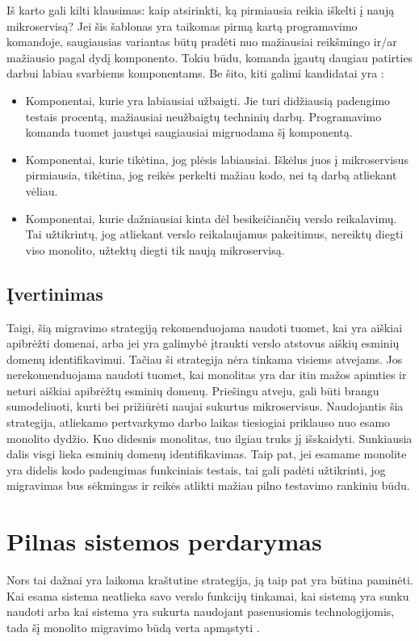 \documentclass{VUMIFPSbakalaurinis}
\begin{document}
Iš karto gali kilti klausimas: kaip atsirinkti, ką pirmiausia reikia iškelti į naują mikroservisą? Jei šis šablonas yra taikomas pirmą kartą programavimo komandoje, saugiausias variantas būtų pradėti nuo mažiausiai reikšmingo ir/ar mažiausio pagal dydį komponento. Tokiu būdu, komanda įgautų daugiau patirties darbui labiau svarbiems komponentams. Be šito, kiti galimi kandidatai yra \cite{Beh18}:
\begin{itemize}
    \item Komponentai, kurie yra labiausiai užbaigti. Jie turi didžiausią padengimo testais procentą, mažiausiai neužbaigtų techninių darbų. Programavimo komanda tuomet jaustųsi saugiausiai migruodama šį komponentą.
    
    \item Komponentai, kurie tikėtina, jog plėsis labiausiai. Iškėlus juos į mikroservisus pirmiausia, tikėtina, jog reikės perkelti mažiau kodo, nei tą darbą atliekant vėliau.
    
    \item Komponentai, kurie dažniausiai kinta dėl besikeičiančių verslo reikalavimų. Tai užtikrintų, jog atliekant verslo reikalaujamus pakeitimus, nereiktų diegti viso monolito, užtektų diegti tik naują mikroservisą.\\
\end{itemize}

\subsection{Įvertinimas}
Taigi, šią migravimo strategiją rekomenduojama naudoti tuomet, kai yra aiškiai apibrėžti domenai, arba jei yra galimybė įtraukti verslo atstovus aiškių esminių domenų identifikavimui. Tačiau ši strategija nėra tinkama visiems atvejams. Jos nerekomenduojama naudoti tuomet, kai monolitas yra dar itin mažos apimties ir neturi aiškiai apibrėžtų esminių domenų. Priešingu atveju, gali būti brangu sumodeliuoti, kurti bei prižiūrėti naujai sukurtus mikroservisus. Naudojantis šia strategija, atliekamo pertvarkymo darbo laikas tiesiogiai priklauso nuo esamo monolito dydžio. Kuo didesnis monolitas, tuo ilgiau truks jį išskaidyti. Sunkiausia dalis visgi lieka esminių domenų identifikavimas. Taip pat, jei esamame monolite yra didelis kodo padengimas funkciniais testais, tai gali padėti užtikrinti, jog migravimas bus sėkmingas ir reikės atlikti mažiau pilno testavimo rankiniu būdu.

\section{Pilnas sistemos perdarymas}
Nors tai dažnai yra laikoma kraštutine strategija, ją taip pat yra būtina paminėti. Kai esama sistema neatlieka savo verslo funkcijų tinkamai, kai sistemą yra sunku naudoti arba kai sistema yra sukurta naudojant pasenusiomis technologijomis, tada šį monolito migravimo būdą verta apmąstyti \cite{MQO18}.
\end{document}
